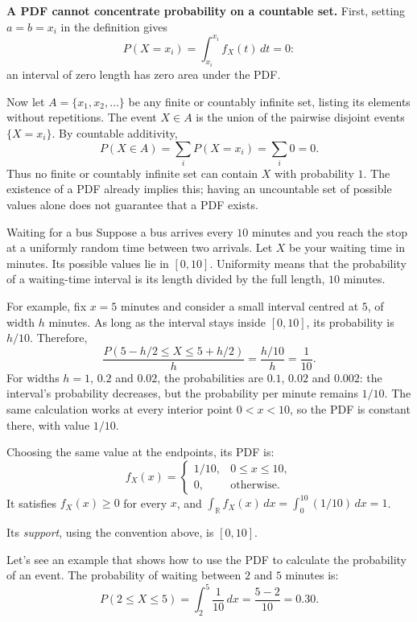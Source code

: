 \documentclass[a4paper,12pt,oneside]{report}
\begin{document}
\begin{tcolorbox}[notesbox,colframe=red!45,colback=red!3,
  boxed title style={colback=red!25,colframe=red!45},
  title={Note: Heads-up}]
\textbf{A PDF cannot concentrate probability on a countable set.}
First, setting $a=b=x_i$ in the definition gives
\[
  P(X=x_i)=\int_{x_i}^{x_i}f_X(t)\,dt=0:
\]
an interval of zero length has zero area under the PDF.

Now let $A=\{x_1,x_2,\ldots\}$ be any finite or countably infinite
set, listing its elements without repetitions. The event $X\in A$
is the union of the pairwise disjoint events $\{X=x_i\}$. By
countable additivity,
\[
  P(X\in A)=\sum_i P(X=x_i)=\sum_i0=0.
\]
Thus no finite or countably infinite set can contain $X$ with
probability $1$. The existence of a PDF already implies this;
having an uncountable set of possible values alone does not
guarantee that a PDF exists.
\end{tcolorbox}

\begin{framedexample}{Waiting for a bus}
Suppose a bus arrives every $10$ minutes and you reach the stop
at a uniformly random time between two arrivals. Let $X$ be your
waiting time in minutes. Its possible values lie in $[0,10]$.
Uniformity means that the probability of a waiting-time interval
is its length divided by the full length, $10$ minutes.

For example, fix $x=5$ minutes and consider a small interval
centred at $5$, of width $h$ minutes. As long as the interval
stays inside $[0,10]$, its probability is $h/10$. Therefore,
\[
  \frac{P(5-h/2\leq X\leq5+h/2)}{h}
  =\frac{h/10}{h}=\frac1{10}.
\]
For widths $h=1$, $0.2$ and $0.02$, the probabilities are
$0.1$, $0.02$ and $0.002$: the interval's probability decreases,
but the probability per minute remains $1/10$.
The same calculation works at every interior point $0<x<10$,
so the PDF is constant there, with value $1/10$.

Choosing the same value at the endpoints, its PDF is:
\[
  f_X(x)=
  \begin{cases}
    1/10, & 0\leq x\leq10,\\
    0, & \text{otherwise}.
  \end{cases}
\]
It satisfies $f_X(x)\geq0$ for every $x$, and
$\int_{\mathbb R}f_X(x)\,dx=\int_0^{10}(1/10)\,dx=1$.

Its \emph{support}, using the convention above, is $[0,10]$.

Let's see an example that shows how to use the PDF to calculate
the probability of an event. The probability of waiting between
$2$ and $5$ minutes is:
\[
  P(2\leq X\leq5)=\int_2^5\frac1{10}\,dx
    =\frac{5-2}{10}=0.30.
\]
\end{framedexample}
\end{document}
